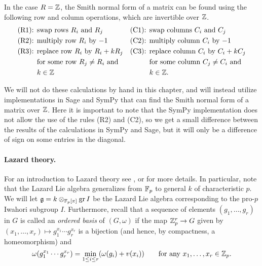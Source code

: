 \begin{remark}
  In the case $R = \mathbb{Z}$, the Smith normal form of a matrix can be found using the following row and column operations, which are invertible over $\mathbb{Z}$.
  \begin{align*}
    \text{(R1): } & \text{swap rows $R_{i}$ and $R_{j}$} & \text{(C1): } & \text{swap columns $C_{i}$ and $C_{j}$} \\
    \text{(R2): } & \text{multiply row $R_{i}$ by $-1$} & \text{(C2): } & \text{multiply column $C_{i}$ by $-1$} \\
    \text{(R3): } & \text{replace row $R_{i}$ by $R_{i} + kR_{j}$} & \text{(C3): } & \text{replace column $C_{i}$ by $C_{i} + kC_{j}$} \\
                  & \text{for some row $R_{j} \neq R_{i}$ and} && \text{for some column $C_{j} \neq C_{i}$ and} \\
    & k\in\mathbb{Z} && k\in\mathbb{Z}.
  \end{align*}

  \noindent We will not do these calculations by hand in this chapter, and will instead utilize implementations in Sage and SymPy that can find the Smith normal form of a matrix over $\mathbb{Z}$. Here it is important to note that the SymPy implementation does not allow the use of the rules (R2) and (C2), so we get a small difference between the results of the calculations in SymPy and Sage, but it will only be a difference of sign on some entries in the diagonal.
\end{remark}

\paragraph{Lazard theory.} For an introduction to Lazard theory see , or \cite{Sch} for more details. In particular, note that the Lazard Lie algebra generalizes from $\mathbb{F}_{p}$ to general $k$ of characteristic $p$. We will let $\mathfrak{g} = k \otimes_{\mathbb{F}_p[\pi]} \operatorname{gr} I$ be the Lazard Lie algebra corresponding to the pro-$p$ Iwahori subgroup $I$. Furthermore, recall that a sequence of elements $(g_1,\dotsc,g_r)$ in $G$ is called an \emph{ordered basis} of $(G,\omega)$ if the map $\mathbb{Z}_{p}^{r} \to G$ given by $(x_{1},\dotsc,x_{r}) \mapsto g_{1}^{x_{1}} \dotsb g_{r}^{x_{r}}$ is a bijection (and hence, by compactness, a homeomorphism) and
\begin{equation*}
  \omega(g_1^{x_1}\dotsb g_r^{x_r}) = \min_{1 \leq i \leq r}(\omega(g_i)+v(x_i)) \qquad \text{for any } x_1,\dotsc,x_r\in\mathbb{Z}_p.
\end{equation*}


